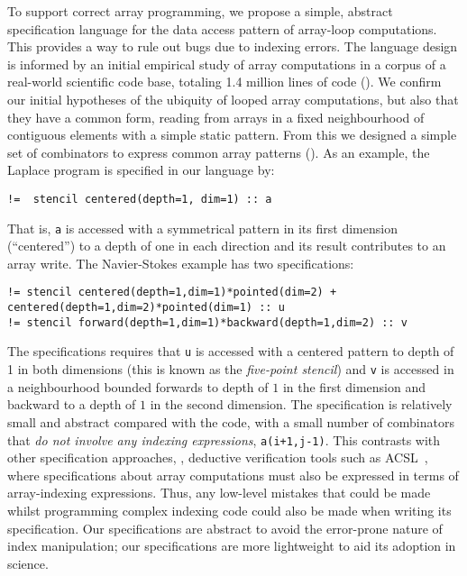 To support correct array programming, we propose a simple,
abstract specification language for the data access pattern of
array-loop computations. This provides a way to rule out bugs due to
indexing errors. The language design is informed by an initial
empirical study of array computations in a corpus of a real-world
scientific code base, totaling 1.4 million lines of
code (). We confirm our initial hypotheses of the
ubiquity of looped array computations, but also that they have a
common form, reading from arrays in a fixed neighbourhood of
contiguous elements with a simple static pattern. From this we
designed a simple set of combinators to express common array patterns ().
As an example, the Laplace program is specified in our language by:
%
\begin{verbatim}
!=  stencil centered(depth=1, dim=1) :: a
\end{verbatim}
%
That is, \texttt{a} is accessed with a symmetrical pattern in its
first dimension (``centered'') to a depth of one in each direction and
its result contributes to an array
write.  The Navier-Stokes example has two specifications:
%
\begin{verbatim}
!= stencil centered(depth=1,dim=1)*pointed(dim=2) + centered(depth=1,dim=2)*pointed(dim=1) :: u
!= stencil forward(depth=1,dim=1)*backward(depth=1,dim=2) :: v
\end{verbatim}
%
\label{exm:checking}
The specifications requires that \texttt{u}
is accessed with a centered pattern to depth of 1 in both dimensions
(this is known as the \emph{five-point stencil}) and \texttt{v} is
accessed in a neighbourhood bounded forwards to depth of $1$ in the
first dimension and backward to a depth of $1$ in the second
dimension. The specification is relatively small and abstract compared
with the code, with a small number of combinators that \emph{do not
  involve any indexing expressions}, \eg{} \texttt{a(i+1,j-1)}. This
contrasts with other specification approaches, \eg{}, deductive
verification tools such as ACSL~\citet{baudin2008acsl}, where
specifications about array computations must also be expressed in
terms of array-indexing expressions. Thus, any low-level mistakes that
could be made whilst programming complex indexing code could also be
made when writing its specification. Our specifications are
abstract to avoid the error-prone nature of index manipulation; our
specifications are more lightweight to aid its adoption in science.

